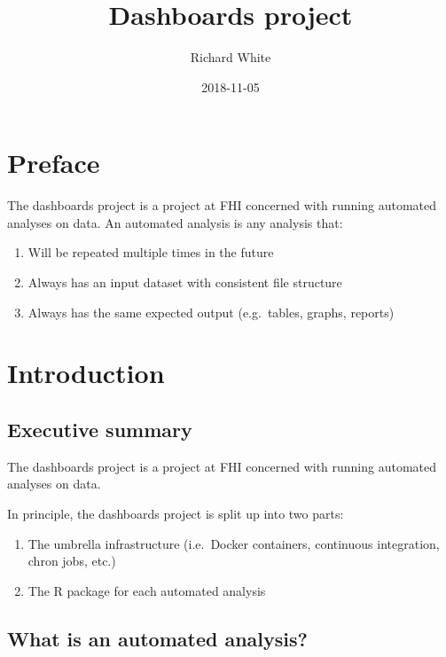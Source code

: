 \documentclass[12pt,]{article}
\title{Dashboards project}
\author{Richard White}
\date{2018-11-05}
\providecommand{\tightlist}{%
  \setlength{\itemsep}{0pt}\setlength{\parskip}{0pt}}
\begin{document}
\maketitle

{
\hypersetup{linkcolor=black}
\setcounter{tocdepth}{2}
\tableofcontents
}
\listoftables
\listoffigures
\section*{Preface}\label{preface}

The dashboards project is a project at FHI concerned with running
automated analyses on data. An automated analysis is any analysis that:

\begin{enumerate}
\def\labelenumi{\arabic{enumi}.}
\tightlist
\item
  Will be repeated multiple times in the future
\item
  Always has an input dataset with consistent file structure
\item
  Always has the same expected output (e.g.~tables, graphs, reports)
\end{enumerate}

\section{Introduction}\label{introduction}

\subsection{Executive summary}\label{executive-summary}

The dashboards project is a project at FHI concerned with running
automated analyses on data.

In principle, the dashboards project is split up into two parts:

\begin{enumerate}
\def\labelenumi{\arabic{enumi}.}
\tightlist
\item
  The umbrella infrastructure (i.e.~Docker containers, continuous
  integration, chron jobs, etc.)
\item
  The R package for each automated analysis
\end{enumerate}

\subsection{What is an automated
analysis?}\label{what-is-an-automated-analysis}
\end{document}
